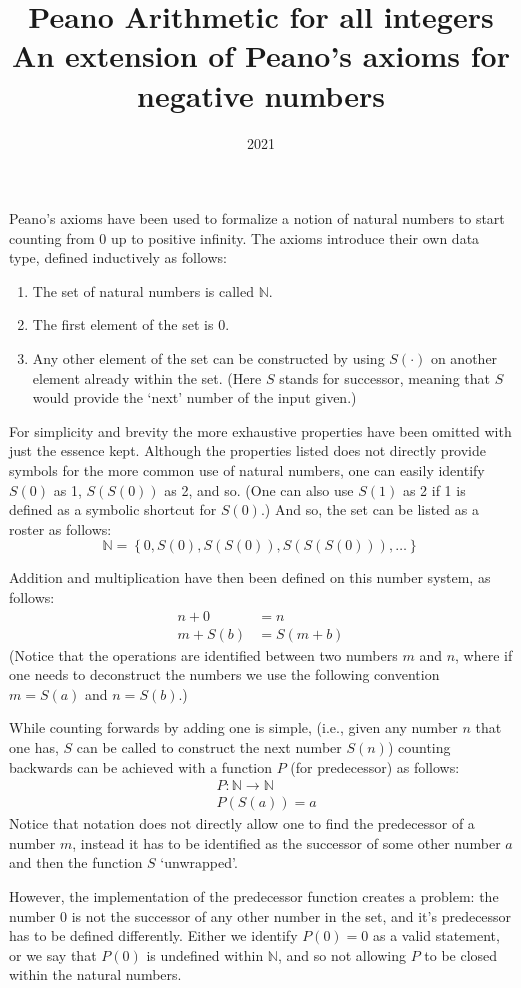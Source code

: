 \documentclass{article}
\title{Peano Arithmetic for all integers\\[2pt]
\large An extension of Peano's axioms for negative numbers}
\author{}
\date{2021}
\newcommand{\N}{\mathbb{N}}
\begin{document}
\maketitle

Peano's axioms have been used to formalize a notion of natural numbers to start counting from 0 up to positive infinity. The axioms introduce their own data type, defined inductively as follows:
\begin{enumerate}
\item The set of natural numbers is called $\mathbb{N}$.
\item The first element of the set is 0.
\item Any other element of the set can be constructed by using $S(\cdot)$ on another element already within the set. (Here $S$ stands for successor, meaning that $S$ would provide the `next' number of the input given.)
\end{enumerate}

For simplicity and brevity the more exhaustive properties have been omitted with just the essence kept. Although the properties listed does not directly provide symbols for the more common use of natural numbers, one can easily identify $S(0)$ as 1, $S(S(0))$ as 2, and so. (One can also use $S(1)$ as 2 if 1 is defined as a symbolic shortcut for $S(0)$.)
And so, the set can be listed as a roster as follows:
\[\mathbb{N} = \left\{0, S(0), S(S(0)), S(S(S(0))), \dots\right\}\]

Addition and multiplication have then been defined on this number system, as follows:
\begin{align}
n + 0 &= n \\
m + S(b) &= S(m + b)
\end{align}
(Notice that the operations are identified between two numbers $m$ and $n$, where if one needs to deconstruct the numbers we use the following convention $m = S(a)$ and $n = S(b)$.)

While counting forwards by adding one is simple, (i.e., given any number $n$ that one has, $S$ can be called to construct the next number $S(n)$) counting backwards can be achieved with a function $P$ (for predecessor) as follows:
\begin{align}
&{} P : \N \to \N \\
&{} P(S(a)) = a
\end{align}
Notice that notation does not directly allow one to find the predecessor of a number $m$, instead it has to be identified as the successor of some other number $a$ and then the function $S$ `unwrapped'.

However, the implementation of the predecessor function creates a problem: the number 0 is not the successor of any other number in the set, and it's predecessor has to be defined differently. Either we identify $P(0) = 0$ as a valid statement, or we say that $P(0)$ is undefined within $\N$, and so not allowing $P$ to be closed within the natural numbers.
\end{document}
